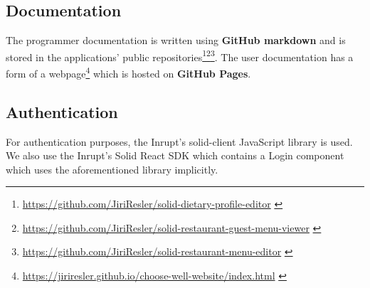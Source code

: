 \subsection*{Documentation}
The programmer documentation is written using \textbf{GitHub markdown} and is stored in the applications' public repositories\footnote{\url{https://github.com/JiriResler/solid-dietary-profile-editor}  \label{fnlabel}}\footnote{\url{https://github.com/JiriResler/solid-restaurant-guest-menu-viewer}  \label{fnlabel}}\footnote{\url{https://github.com/JiriResler/solid-restaurant-menu-editor}  \label{fnlabel}}.
The user documentation has a form of a webpage\footnote{\url{https://jiriresler.github.io/choose-well-website/index.html}  \label{fnlabel}} which is hosted on \textbf{GitHub Pages}.

\subsection*{Authentication}
For authentication purposes, the Inrupt's solid-client JavaScript library is used.
We also use the Inrupt's Solid React SDK which contains a Login component which uses the aforementioned library implicitly.
